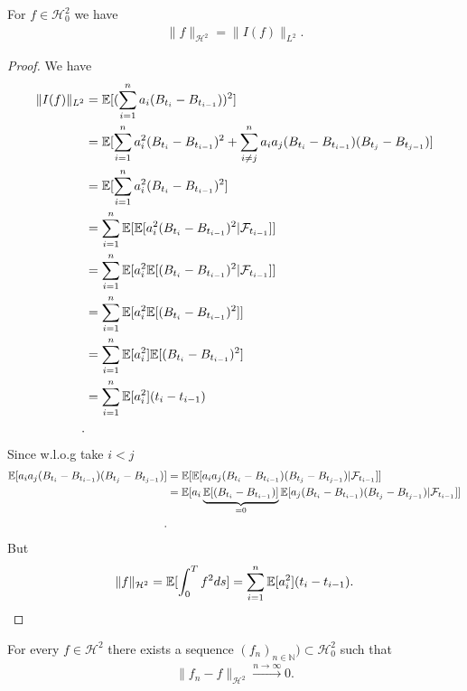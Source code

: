 \begin{Lemma}
 For $f \in  \mathcal{H}_0^{2} $  we have 
 \begin{align*}
   \|f\|_{\mathcal{H}^2} = \|I(f)\|_{L^2}
 .\end{align*}
\end{Lemma}
\begin{proof}
 We have 
 \begin{align*}
   \|I(f)\|_{L^2} &= \mathbb{E}[(\sum_{i=1}^{n} a_i (B_{t_i} - B_{t_{i-1}}))^2]\\
                  &= \mathbb{E}[\sum_{i=1}^{n} a_i^2(B_{t_i}-B_{t_{i-1}})^2 + \sum_{i\neq j}^{n} a_ia_j(B_{t_{i}}-B_{t_{i-1}})(B_{t_{j}}-B_{t_{j-1}})  ]\\
                  &=  \mathbb{E}[\sum_{i=1}^{n} a_i^2(B_{t_i}-B_{t_{i-1}})^2]\\
                  &=  \sum_{i=1}^{n} \mathbb{E}[\mathbb{E}[a_i^2(B_{t_i}-B_{t_{i-1}})^2 | \mathcal{F}_{t_{i-1}}]]\\
                  &=  \sum_{i=1}^{n} \mathbb{E}[a_i^2\mathbb{E}[(B_{t_i}-B_{t_{i-1}})^2 | \mathcal{F}_{t_{i-1}}]]\\
                  &=  \sum_{i=1}^{n} \mathbb{E}[a_i^2\mathbb{E}[(B_{t_i}-B_{t_{i-1}})^2]]\\
                  &=  \sum_{i=1}^{n} \mathbb{E}[a_i^2]\mathbb{E}[(B_{t_i}-B_{t_{i-1}})^2]\\
                  &=  \sum_{i=1}^{n} \mathbb{E}[a_i^2](t_i-t_{i-1})\\
 .\end{align*}
 Since  w.l.o.g take $i<j$
 \begin{align*}
   \mathbb{E}[a_ia_j(B_{t_{i}}-B_{t_{i-1}})(B_{t_{j}}-B_{t_{j-1}})  ] &= \mathbb{E}[\mathbb{E}[a_ia_j(B_{t_{i}}-B_{t_{i-1}})(B_{t_{j}}-B_{t_{j-1}}) | \mathcal{F}_{t_{i-1}}] ]\\
                                                              &= \mathbb{E}[a_i \underbrace{\mathbb{E}[(B_{t_{i}}-B_{t_{i-1}})]}_{=0}\mathbb{E}[a_j(B_{t_{i}}-B_{t_{i-1}})(B_{t_{j}}-B_{t_{j-1}}) | \mathcal{F}_{t_{i-1}}] ]\\
 .\end{align*}
 But 
 \begin{align*}
   \|f\|_{\mathcal{H}^2} = \mathbb{E}[\int_0^{T} f^2 ds ] = \sum_{i=1}^{n}\mathbb{E}[a_i^2](t_i-t_{i-1})
 .\end{align*}
\end{proof}
\begin{Prop}[3.5]
  For every $f \in  \mathcal{H}^2$  there exists a sequence $(f_n)_{n \in  \mathbb{N}}) \subset  \mathcal{H}_0^{2} $ such that 
  \begin{align*}
    \|f_n - f\|_{\mathcal{H}^2}\xrightarrow{n\to \infty} 0
  .\end{align*}
\end{Prop}
